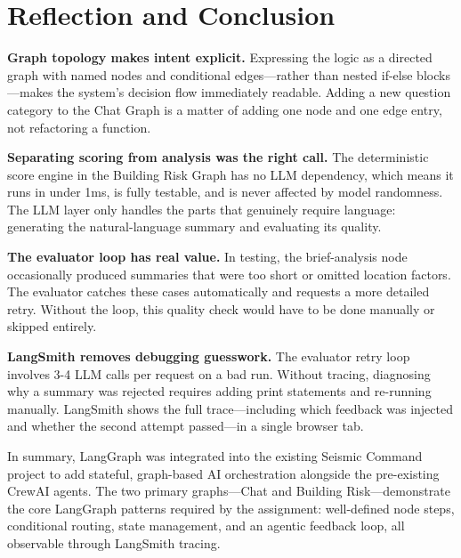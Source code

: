 \documentclass[11pt,a4paper]{article}
\begin{document}
\section{Reflection and Conclusion}

\begin{reflectionbox}
\textbf{Graph topology makes intent explicit.} Expressing the logic as a directed graph with named nodes and conditional edges---rather than nested if-else blocks---makes the system's decision flow immediately readable. Adding a new question category to the Chat Graph is a matter of adding one node and one edge entry, not refactoring a function.
\end{reflectionbox}

\vspace{0.3em}

\begin{reflectionbox}
\textbf{Separating scoring from analysis was the right call.} The deterministic score engine in the Building Risk Graph has no LLM dependency, which means it runs in under 1ms, is fully testable, and is never affected by model randomness. The LLM layer only handles the parts that genuinely require language: generating the natural-language summary and evaluating its quality.
\end{reflectionbox}

\vspace{0.3em}

\begin{reflectionbox}
\textbf{The evaluator loop has real value.} In testing, the brief-analysis node occasionally produced summaries that were too short or omitted location factors. The evaluator catches these cases automatically and requests a more detailed retry. Without the loop, this quality check would have to be done manually or skipped entirely.
\end{reflectionbox}

\vspace{0.3em}

\begin{reflectionbox}
\textbf{LangSmith removes debugging guesswork.} The evaluator retry loop involves 3-4 LLM calls per request on a bad run. Without tracing, diagnosing why a summary was rejected requires adding print statements and re-running manually. LangSmith shows the full trace---including which feedback was injected and whether the second attempt passed---in a single browser tab.
\end{reflectionbox}

\vspace{0.5em}

In summary, LangGraph was integrated into the existing Seismic Command project to add stateful, graph-based AI orchestration alongside the pre-existing CrewAI agents. The two primary graphs---Chat and Building Risk---demonstrate the core LangGraph patterns required by the assignment: well-defined node steps, conditional routing, state management, and an agentic feedback loop, all observable through LangSmith tracing.
\end{document}

